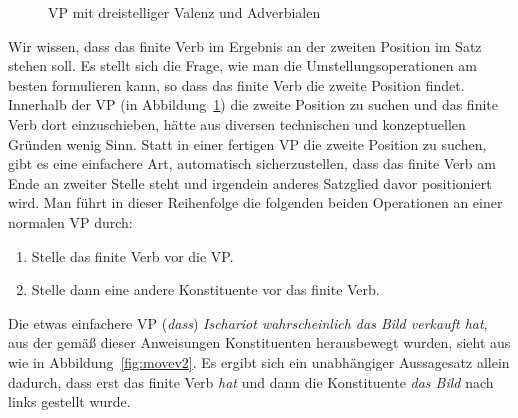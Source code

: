 \begin{figure}[h]
  \caption{VP mit dreistelliger Valenz und Adverbialen}
  \label{fig:vgreinstelligwh}
\end{figure}

Wir wissen, dass das finite Verb im Ergebnis an der zweiten Position im Satz stehen soll.
Es stellt sich die Frage, wie man die Umstellungsoperationen am besten formulieren kann, so dass das finite Verb die zweite Position findet.
Innerhalb der VP (\zB in Abbildung~\ref{fig:vgreinstelligwh}) die zweite Position zu suchen und das finite Verb dort einzuschieben, hätte aus diversen technischen und konzeptuellen Gründen wenig Sinn.
Statt in einer fertigen VP die zweite Position zu suchen, gibt es eine einfachere Art, automatisch sicherzustellen, dass das finite Verb am Ende an zweiter Stelle steht und irgendein anderes Satzglied davor positioniert wird.
Man führt in dieser Reihenfolge die folgenden beiden Operationen an einer normalen VP durch:

\begin{enumerate}\Lf
  \item Stelle das finite Verb vor die VP.
  \item Stelle dann eine andere Konstituente vor das finite Verb.
\end{enumerate}

Die etwas einfachere VP (\textit{dass}) \textit{Ischariot wahrscheinlich das Bild verkauft hat}, aus der gemäß dieser Anweisungen Konstituenten herausbewegt wurden, sieht aus wie in Abbildung~\ref{fig:movev2}.
Es ergibt sich ein unabhängiger Aussagesatz allein dadurch, dass erst das finite Verb \textit{hat} und dann die Konstituente \textit{das Bild} nach links gestellt wurde.


